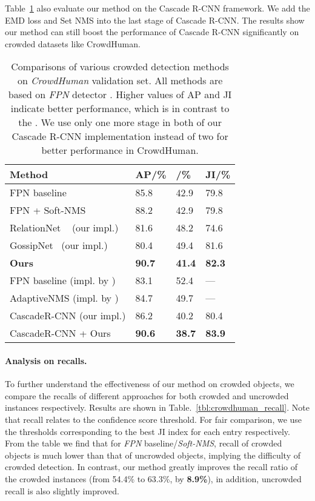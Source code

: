 \documentclass[10pt,twocolumn,letterpaper]{article}
\begin{document}
Table~\ref{tbl:crowdhuman_comp} also evaluate our method on the Cascade R-CNN \cite{cai2019cascadercnn} framework. 
We add the EMD loss and Set NMS into the last stage of Cascade R-CNN.
The results show our method can still boost the performance of Cascade R-CNN significantly on crowded datasets like CrowdHuman.
\begin{table}[ht]
   \centering
   \begin{tabular}{p{44mm}|p{6mm}<{\centering}p{10mm}<{\centering}p{6mm}<{\centering}}
   \toprule
       Method & AP/\% & /\%  & JI/\% \\
       \hline
      FPN baseline & 85.8 & 42.9 & 79.8 \\
      FPN + Soft-NMS \cite{softnms} & 88.2 & 42.9 & 79.8 \\
       \hline
       RelationNet ~\cite{hu2017relation} (our impl.) & 81.6 & 48.2 & 74.6 \\
       GossipNet~\cite{learningnms}  (our impl.) &  80.4 & 49.4 & 81.6  \\
       \hline
       \textbf{Ours} & \textbf{90.7} & \textbf{41.4} & \textbf{82.3} \\
       \hline
       \hline
       FPN baseline (impl. by \cite{adaptiveNMS}) & 83.1 & 52.4 & --- \\
       AdaptiveNMS (impl. by \cite{adaptiveNMS}) & 84.7 & 49.7 & --- \\
       \hline
       \hline
       CascadeR-CNN \cite{cai2019cascadercnn} (our impl.) & 86.2 & 40.2 & 80.4 \\
       CascadeR-CNN + Ours & \textbf{90.6} & \textbf{38.7} & \textbf{83.9} \\
       \bottomrule
   \end{tabular}
   \caption{Comparisons of various crowded detection methods on \emph{CrowdHuman} validation set. All methods are based on \emph{FPN} detector \cite{lin2017feature}. Higher values of AP and JI indicate better performance, which is in contrast to the .
      We use only one more stage in both of our Cascade R-CNN implementation instead of two for better performance in CrowdHuman.}
   \label{tbl:crowdhuman_comp}
\end{table}

\paragraph{Analysis on recalls.}
To further understand the effectiveness of our method on crowded objects, we compare the recalls of different approaches for both crowded and uncrowded instances respectively. Results are shown in Table.~\ref{tbl:crowdhuman_recall}. Note that recall relates to the confidence score threshold. For fair comparison, we use the thresholds corresponding to the best JI index for each entry respectively. From the table we find that for \emph{FPN} baseline/\emph{Soft-NMS}, recall of crowded objects is much lower than that of uncrowded objects, implying the difficulty of crowded detection. In contrast, our method greatly improves the recall ratio of the crowded instances (from 54.4\% to 63.3\%, by \textbf{8.9\%}), in addition, uncrowded recall is also slightly improved. 
\end{document}
